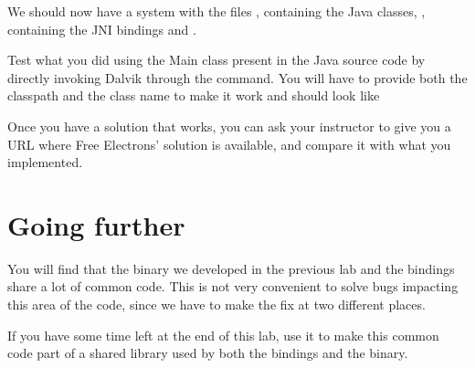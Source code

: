 We should now have a system with the files
, containing the Java
classes, , containing the JNI bindings and
.

Test what you did using the Main class present in the Java source code
by directly invoking Dalvik through the 
command. You will have to provide both the classpath and the class
name to make it work and should look like

Once you have a solution that works, you can ask your instructor to 
give you a URL where Free Electrons' solution is available, and compare
it with what you implemented.

\section{Going further}

You will find that the binary we developed in the previous lab and
the bindings share a lot of common code. This is not very convenient
to solve bugs impacting this area of the code, since we have to make
the fix at two different places.

If you have some time left at the end of this lab, use it to make this
common code part of a shared library used by both the bindings and the
binary.
